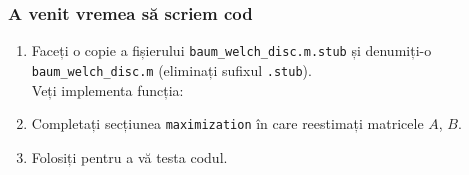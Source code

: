 \begin{frame}
  \frametitle{A venit vremea să scriem cod}
  \begin{enumerate}
  \item Faceți o copie a fișierului \texttt{baum\_welch\_disc.m.stub} 
    și denumiți-o \texttt{baum\_welch\_disc.m} (eliminați sufixul \texttt{.stub}).
    \\Veți implementa funcția:\\
    \pause
  \item Completați secțiunea \texttt{maximization} în care reestimați matricele $A$, $B$.%
    \vspace*{-1em}
    
\item Folosiți  pentru a vă testa codul.
\end{enumerate}
\end{frame}

